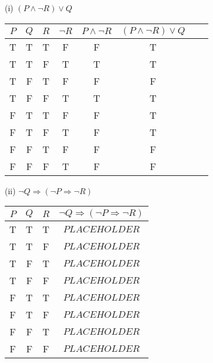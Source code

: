 \documentclass{article}
\begin{document}
(i) $(P \land \neg R) \lor Q$\\
\begin{tabular}{|c|c|c|c|c|c|c|c|}
    \hline
    $P$ & $Q$ & $R$ & $\neg R$ & $ P \land \neg R$ & $(P \land \neg R) \lor Q$ \\
    \hline
    T   & T   & T   & F        & F                 & T                         \\
    T   & T   & F   & T        & T                 & T                         \\
    T   & F   & T   & F        & F                 & F                         \\
    T   & F   & F   & T        & T                 & T                         \\
    F   & T   & T   & F        & F                 & T                         \\
    F   & T   & F   & T        & F                 & T                         \\
    F   & F   & T   & F        & F                 & F                         \\
    F   & F   & F   & T        & F                 & F                         \\
    \hline
\end{tabular}

(ii) $\neg Q \Rightarrow (\neg P \Rightarrow \neg R)$\\
\begin{tabular}{|c|c|c|c|}
    \hline
    $P$ & $Q$ & $R$ & $\neg Q \Rightarrow (\neg P \Rightarrow \neg R)$ \\
    \hline
    T   & T   & T   & $PLACEHOLDER$                                    \\
    T   & T   & F   & $PLACEHOLDER$                                    \\
    T   & F   & T   & $PLACEHOLDER$                                    \\
    T   & F   & F   & $PLACEHOLDER$                                    \\
    F   & T   & T   & $PLACEHOLDER$                                    \\
    F   & T   & F   & $PLACEHOLDER$                                    \\
    F   & F   & T   & $PLACEHOLDER$                                    \\
    F   & F   & F   & $PLACEHOLDER$                                    \\
    \hline
\end{tabular}
\end{document}
